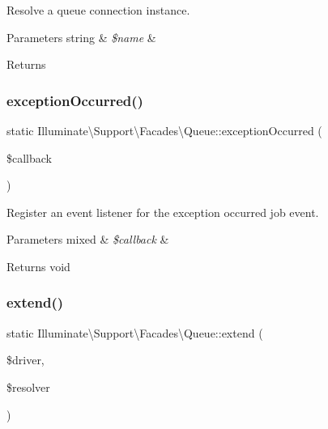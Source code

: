 Resolve a queue connection instance.


\begin{DoxyParams}[1]{Parameters}
string & {\em \$name} & \\
\hline
\end{DoxyParams}
\begin{DoxyReturn}{Returns}

\end{DoxyReturn}
\mbox{\label{class_illuminate_1_1_support_1_1_facades_1_1_queue_aa9660b4de41a9ebb4f7dd26c8071a6da}} 
\subsubsection{\texorpdfstring{exception\+Occurred()}{exceptionOccurred()}}
{\footnotesize\ttfamily static Illuminate\textbackslash{}\+Support\textbackslash{}\+Facades\textbackslash{}\+Queue\+::exception\+Occurred (\begin{DoxyParamCaption}\item[{}]{\$callback }\end{DoxyParamCaption})\hspace{0.3cm}{\ttfamily [static]}}

Register an event listener for the exception occurred job event.


\begin{DoxyParams}[1]{Parameters}
mixed & {\em \$callback} & \\
\hline
\end{DoxyParams}
\begin{DoxyReturn}{Returns}
void 
\end{DoxyReturn}
\mbox{\label{class_illuminate_1_1_support_1_1_facades_1_1_queue_ad95bc43c71e4d5191be6bfa129fe4170}} 
\subsubsection{\texorpdfstring{extend()}{extend()}}
{\footnotesize\ttfamily static Illuminate\textbackslash{}\+Support\textbackslash{}\+Facades\textbackslash{}\+Queue\+::extend (\begin{DoxyParamCaption}\item[{}]{\$driver,  }\item[{}]{\$resolver }\end{DoxyParamCaption})\hspace{0.3cm}{\ttfamily [static]}}

